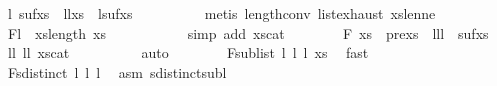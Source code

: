 \begin{isabellebody}
\ l{}\ sufxs{}\ \ l{}l{}{\isacharcolon}{\kern0pt}{\isachardoublequoteopen}xs{}\ {\isacharequal}{\kern0pt}\ l{}{\isacharhash}{\kern0pt}sufxs{}{\isachardoublequoteclose}\isanewline
\ \ \ \ \ \ \ \ \isamarkupfalse%
\ {\isacharparenleft}{\kern0pt}metis\ length{\isacharunderscore}{\kern0pt}{}{\isacharunderscore}{\kern0pt}conv\ list{\isachardot}{\kern0pt}exhaust\ xs{}{\isacharunderscore}{\kern0pt}len{\isacharunderscore}{\kern0pt}ne{\isacharunderscore}{\kern0pt}{}{\isacharparenright}{\kern0pt}\isanewline
\isanewline
\ \ \ \ \ \ \isamarkupfalse%
\ F{}{\isacharcolon}{\kern0pt}{\isachardoublequoteopen}l{}\ {\isacharequal}{\kern0pt}\ xs{\isacharbang}{\kern0pt}{\isacharparenleft}{\kern0pt}length\ xs{}{\isacharparenright}{\kern0pt}{\isachardoublequoteclose}\ \ \ \ \ \ \ \ \ \ \isamarkupfalse%
\ {\isacharparenleft}{\kern0pt}simp\ add{\isacharcolon}{\kern0pt}\ xs{\isacharunderscore}{\kern0pt}cat{\isacharparenright}{\kern0pt}\isanewline
\ \ \ \ \ \ \isamarkupfalse%
\ F{}{}{\isacharcolon}{\kern0pt}\ {\isachardoublequoteopen}xs\ {\isacharequal}{\kern0pt}\ prexs{}\ {\isacharat}{\kern0pt}\ {\isacharbrackleft}{\kern0pt}l{}{\isacharcomma}{\kern0pt}l{}{\isacharcomma}{\kern0pt}l{}{\isacharbrackright}{\kern0pt}\ {\isacharat}{\kern0pt}\ sufxs{}{\isachardoublequoteclose}\ \isamarkupfalse%
\ l{}l{}\ l{}l{}\ xs{\isacharunderscore}{\kern0pt}cat\isanewline
\ \ \ \ \ \ \ \ \isamarkupfalse%
\ auto\isanewline
\ \ \ \ \ \ \isamarkupfalse%
\ F{}{}{\isacharcolon}{\kern0pt}{\isachardoublequoteopen}sublist\ {\isacharbrackleft}{\kern0pt}l{}{\isacharcomma}{\kern0pt}\ l{}{\isacharcomma}{\kern0pt}\ l{}{\isacharbrackright}{\kern0pt}\ xs{\isachardoublequoteclose}\ \isamarkupfalse%
\ fast\isanewline
\ \ \ \ \ \ \isamarkupfalse%
\ F{}{}{\isacharcolon}{\kern0pt}{\isachardoublequoteopen}sdistinct\ {\isacharbrackleft}{\kern0pt}l{}{\isacharcomma}{\kern0pt}\ l{}{\isacharcomma}{\kern0pt}\ l{}{\isacharbrackright}{\kern0pt}{\isachardoublequoteclose}\ \isamarkupfalse%
\ asm{\isacharparenleft}{\kern0pt}{}{\isacharparenright}{\kern0pt}\ sdistinct{\isacharunderscore}{\kern0pt}subl\ \isamarkupfalse%

\end{isabellebody}
